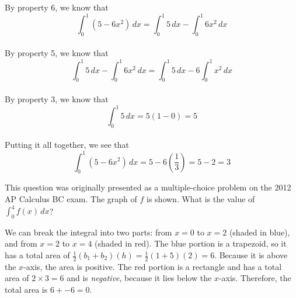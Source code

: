 \begin{Answer}[ref=defint2]
By property 6, we know that $$\int_{0}^{1} (5-6x^2)\,dx = \int_{0}^{1} 
5\,dx - \int_{0}^{1} 6x^2\,dx$$\\
By property 5, we know that $$\int_{0}^{1} 5\,dx - \int_{0}^{1} 6x^2\,
dx = \int_{0}^{1} 5\,dx - 6\int_{0}^{1} x^2\,dx$$\\
By property 3, we know that $$\int_{0}^{1} 5\,dx = 5(1 - 0) = 5$$\\
Putting it all together, we see that $$\int_{0}^{1} (5-6x^2)\,dx = 5 
- 6(\frac{1}{3}) = 5 - 2 = 3$$
\end{Answer}

\begin{Exercise}[label=defint3]
	This question was originally presented as a multiple-choice problem 
	on the 2012 AP Calculus BC exam. The graph of $f$ is shown. What is 
	the value of $\int_{0}^{4} f(x)\,dx$?\\
\end{Exercise}

\begin{Answer}[ref=defint3]
We can break the integral into two parts: from $x = 0$ to $x = 2$ 
(shaded in blue), and from $x = 2$ to $x = 4$ (shaded in red). The 
blue portion is a trapezoid, so it has a total area of $\frac{1}{2} 
(b_1 + b_2) (h) = \frac{1}{2} (1 + 5) (2) = 6$. Because it is above 
the $x$-axis, the area is positive. The red portion is a rectangle and 
has a total area of $2 \times 3 = 6$ and is \textit{negative}, because 
it lies below the $x$-axis. Therefore, the total area is $6 + -6 = 0$. \\

\end{Answer}

